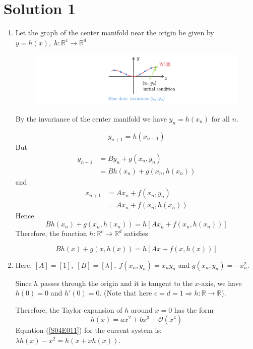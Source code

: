 \documentclass[twoside,10pt,a4paper]{article}
\begin{document}
\section*{Solution 1}
\begin{enumerate}[label=(\alph*)]
\item Let the graph of the center manifold near the origin be given by $y = h(x), \; h:\mathbb{R}^c \rightarrow \mathbb{R}^d$
\begin{figure}[H]
	\centering
	\includegraphics[scale=0.9]{Graphics/S01D01.pdf}
\end{figure}
By the invariance of the center manifold we have $y_n = h(x_n)$ for all $n$.

\begin{equation*}
	y_{n+1} = h(x_{n+1})
\end{equation*}
But
\begin{align*}
	y_{n+1} &= By_n + g(x_n, y_n) \\
	&= Bh(x_n) + g(x_n, h(x_n))
\end{align*}
and
\begin{align*}
	x_{n+1} &= Ax_n + f(x_n, y_n) \\
	&= Ax_n + f(x_n, h(x_n))
\end{align*}
Hence
\begin{equation*}
	Bh(x_n) + g(x_n, h(x_n)) = h[Ax_n + f(x_n, h(x_n))]
\end{equation*}
Therefore, the function $h:\mathbb{R}^c \rightarrow \mathbb{R}^d$ satisfies

\begin{equation}\label{S04E011}\boxed{
		Bh(x) + g(x, h(x)) = h[Ax + f(x, h(x))]
	}
\end{equation}


\item Here, $[A] = [1],\; [B] = [\lambda], \; f(x_n,y_n) = x_ny_n$ and $g(x_n, y_n)=-x_n^2$.

Since $h$ passes through the origin and it is tangent to the $x$-axis, we have $h(0)=0$ and $h'(0)=0$. (Note that here $c=d=1 \Rightarrow h:\mathbb{R} \rightarrow \mathbb{R}$).

Therefore, the Taylor expansion of $h$ around $x=0$ has the form
\begin{equation}\label{S04E012}
	h(x) = ax^2 + bx^3 + \mathcal{O}(x^4)
\end{equation}
Equation (\ref{S04E011}) for the current system is: $\lambda h(x) - x^2 = h(x + xh(x))$.


\end{enumerate}
\end{document}
